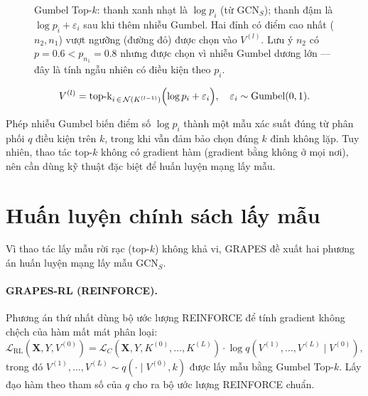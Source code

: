\begin{figure}[htbp]
{}
\caption{Gumbel Top-$k$: thanh xanh nhạt là $\log p_i$ (từ $\text{GCN}_S$); thanh đậm là $\log p_i + \varepsilon_i$ sau khi thêm nhiễu Gumbel. Hai đỉnh có điểm cao nhất ($n_2, n_1$) vượt ngưỡng (đường đỏ) được chọn vào $V^{(l)}$. Lưu ý $n_2$ có $p=0.6 < p_{n_1}=0.8$ nhưng được chọn vì nhiễu Gumbel dương lớn --- đây là tính ngẫu nhiên có điều kiện theo $p_i$.}
\label{fig:gumbel-topk}
\end{figure}

\begin{equation}
V^{(l)} = \operatorname{top\text{-}k}_{i\,\in\,\mathcal{N}(K^{(l-1)})}
\Bigl(\log p_i + \varepsilon_i\Bigr),
\quad \varepsilon_i \sim \mathrm{Gumbel}(0,1).
\end{equation}

Phép nhiễu Gumbel biến điểm số $\log p_i$ thành một mẫu xác suất đúng từ phân phối $q$ điều kiện trên $k$, trong khi vẫn đảm bảo chọn đúng $k$ đỉnh không lặp. Tuy nhiên, thao tác top-$k$ không có gradient hàm (gradient bằng không ở mọi nơi), nên cần dùng kỹ thuật đặc biệt để huấn luyện mạng lấy mẫu.

\section{Huấn luyện chính sách lấy mẫu}
\label{sec:grapes-training}

Vì thao tác lấy mẫu rời rạc (top-$k$) không khả vi, GRAPES đề xuất hai phương án huấn luyện mạng lấy mẫu $\text{GCN}_S$.

\paragraph{GRAPES-RL (REINFORCE).} Phương án thứ nhất dùng bộ ước lượng REINFORCE để tính gradient không chệch của hàm mất mát phân loại:
\begin{equation}
\label{eq:rl}
\mathcal{L}_{\mathrm{RL}}\!\left(\mathbf{X}, Y, V^{(0)}\right)
= \mathcal{L}_C\!\left(\mathbf{X}, Y, K^{(0)},\ldots,K^{(L)}\right)
\cdot \log q\!\left(V^{(1)},\ldots,V^{(L)}\mid V^{(0)}\right),
\end{equation}
trong đó $V^{(1)},\ldots,V^{(L)} \sim q(\cdot\mid V^{(0)}, k)$ được lấy mẫu bằng Gumbel Top-$k$. Lấy đạo hàm theo tham số của $q$ cho ra bộ ước lượng REINFORCE chuẩn.

